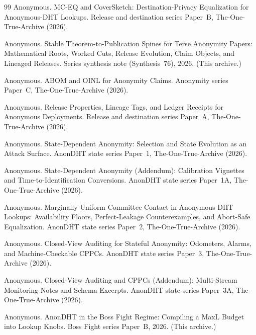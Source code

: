 \documentclass[11pt]{article}
\begin{document}
\begin{thebibliography}{99}
Anonymous.
\newblock MC-EQ and CoverSketch: Destination-Privacy Equalization for Anonymous-DHT Lookups.
\newblock Release and destination series Paper~B, The-One-True-Archive (2026).

Anonymous.
\newblock Stable Theorem-to-Publication Spines for Terse Anonymity Papers: Mathematical Roots, Worked Cuts, Release Evolution, Claim Objects, and Lineaged Releases.
\newblock Series synthesis note (Synthesis~76), 2026. (This archive.)

Anonymous.
\newblock ABOM and OINL for Anonymity Claims.
\newblock Anonymity series Paper~C, The-One-True-Archive (2026).

Anonymous.
\newblock Release Properties, Lineage Tags, and Ledger Receipts for Anonymous Deployments.
\newblock Release and destination series Paper~A, The-One-True-Archive (2026).

Anonymous.
\newblock State-Dependent Anonymity: Selection and State Evolution as an Attack Surface.
\newblock AnonDHT state series Paper~1, The-One-True-Archive (2026).

Anonymous.
\newblock State-Dependent Anonymity (Addendum): Calibration Vignettes and Time-to-Identification Conversions.
\newblock AnonDHT state series Paper~1A, The-One-True-Archive (2026).

Anonymous.
\newblock Marginally Uniform Committee Contact in Anonymous DHT Lookups: Availability Floors, Perfect-Leakage Counterexamples, and Abort-Safe Equalization.
\newblock AnonDHT state series Paper~2, The-One-True-Archive (2026).

Anonymous.
\newblock Closed-View Auditing for Stateful Anonymity: Odometers, Alarms, and Machine-Checkable CPPCs.
\newblock AnonDHT state series Paper~3, The-One-True-Archive (2026).

Anonymous.
\newblock Closed-View Auditing and CPPCs (Addendum): Multi-Stream Monitoring Notes and Schema Excerpts.
\newblock AnonDHT state series Paper~3A, The-One-True-Archive (2026).





Anonymous.
\newblock AnonDHT in the Boss Fight Regime: Compiling a MaxL Budget into Lookup Knobs.
\newblock Boss Fight series Paper~B, 2026. (This archive.)


\end{thebibliography}
\end{document}
